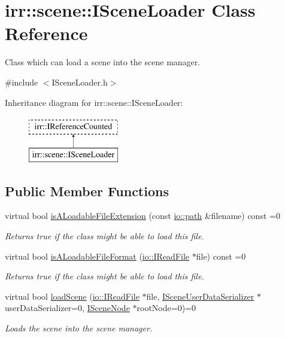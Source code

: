 \hypertarget{classirr_1_1scene_1_1ISceneLoader}{}\section{irr\+:\+:scene\+:\+:I\+Scene\+Loader Class Reference}
\label{classirr_1_1scene_1_1ISceneLoader}


Class which can load a scene into the scene manager.  




{\ttfamily \#include $<$I\+Scene\+Loader.\+h$>$}

Inheritance diagram for irr\+:\+:scene\+:\+:I\+Scene\+Loader\+:\begin{figure}[H]
\begin{center}
\leavevmode
\includegraphics[height=2.000000cm]{classirr_1_1scene_1_1ISceneLoader}
\end{center}
\end{figure}
\subsection*{Public Member Functions}
\begin{DoxyCompactItemize}
\item 
virtual bool \hyperlink{classirr_1_1scene_1_1ISceneLoader_a55b0367762135b84a077ef75ca942594}{is\+A\+Loadable\+File\+Extension} (const \hyperlink{namespaceirr_1_1io_ab1bdc45edb3f94d8319c02bc0f840ee1}{io\+::path} \&filename) const =0
\begin{DoxyCompactList}\small\item\em Returns true if the class might be able to load this file. \end{DoxyCompactList}\item 
virtual bool \hyperlink{classirr_1_1scene_1_1ISceneLoader_a5f1b2f44fcac12acdc2f1948d8f3b258}{is\+A\+Loadable\+File\+Format} (\hyperlink{classirr_1_1io_1_1IReadFile}{io\+::\+I\+Read\+File} $\ast$file) const =0
\begin{DoxyCompactList}\small\item\em Returns true if the class might be able to load this file. \end{DoxyCompactList}\item 
virtual bool \hyperlink{classirr_1_1scene_1_1ISceneLoader_a55282c77040a78c2b172d77bbcff8ae8}{load\+Scene} (\hyperlink{classirr_1_1io_1_1IReadFile}{io\+::\+I\+Read\+File} $\ast$file, \hyperlink{classirr_1_1scene_1_1ISceneUserDataSerializer}{I\+Scene\+User\+Data\+Serializer} $\ast$user\+Data\+Serializer=0, \hyperlink{classirr_1_1scene_1_1ISceneNode}{I\+Scene\+Node} $\ast$root\+Node=0)=0
\begin{DoxyCompactList}\small\item\em Loads the scene into the scene manager. \end{DoxyCompactList}\end{DoxyCompactItemize}
